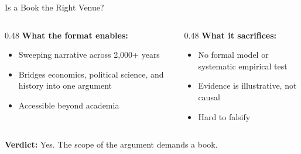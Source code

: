 \documentclass[aspectratio=169, 11pt]{beamer}
\begin{document}
\begin{frame}{Is a Book the Right Venue?}
    \begin{columns}[T]
        \begin{column}{0.48\textwidth}
            \textbf{What the format enables:}
            \begin{itemize}
                \item Sweeping narrative across 2,000+ years
                \item Bridges economics, political science, and history into one argument
                \item Accessible beyond academia
            \end{itemize}
        \end{column}
        \begin{column}{0.48\textwidth}
            \textbf{What it sacrifices:}
            \begin{itemize}
                \item No formal model or systematic empirical test
                \item Evidence is illustrative, not causal
                \item Hard to falsify
            \end{itemize}
        \end{column}
    \end{columns}

    \vspace{1em}
    \begin{center}
        \textbf{Verdict:} Yes. The scope of the argument demands a book.
    \end{center}
\end{frame}

\end{document}
